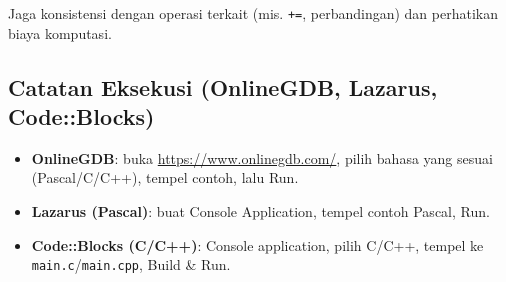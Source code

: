 \documentclass[../main.tex]{subfiles}
\begin{document}
Jaga konsistensi dengan operasi terkait (mis. \texttt{+=}, perbandingan) dan perhatikan biaya komputasi.

\subsection{Catatan Eksekusi (OnlineGDB, Lazarus, Code::Blocks)}
\begin{itemize}
  \item \textbf{OnlineGDB}: buka \url{https://www.onlinegdb.com/}, pilih bahasa yang sesuai (Pascal/C/C++), tempel contoh, lalu Run.
  \item \textbf{Lazarus (Pascal)}: buat Console Application, tempel contoh Pascal, Run.
  \item \textbf{Code::Blocks (C/C++)}: Console application, pilih C/C++, tempel ke \texttt{main.c}/\texttt{main.cpp}, Build \& Run.
\end{itemize}
\end{document}
